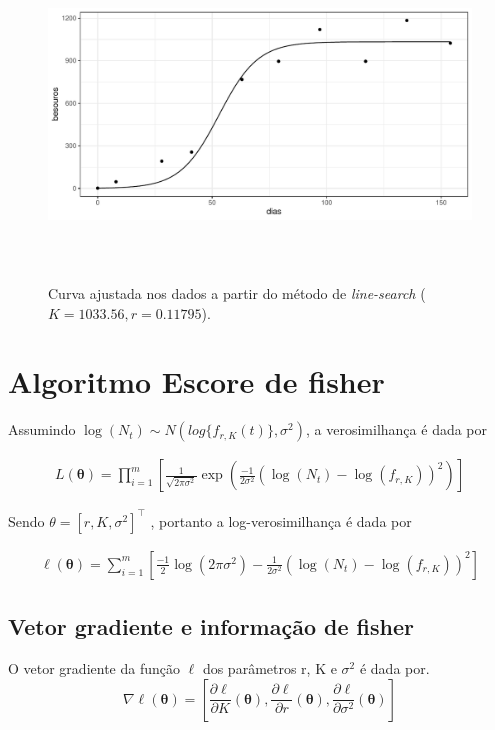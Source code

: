 \documentclass[a4paper,12pt,twoside]{article}
\begin{document}
\begin{figure}[H]
  \centering
  {\includegraphics[width=16cm,height=8cm]{imgs/NR.pdf}}
  \captionsetup{font=footnotesize,width=15cm}
  \caption{\small Curva ajustada nos dados a partir do método de \textit{line-search} ($K=1033.56,r=0.11795$).}
\end{figure}
\section{Algoritmo Escore de fisher}
Assumindo $\log(N_t)\sim N(log\{f_{r,K}(t)\},\sigma^2)$, a verosimilhança é dada por 

\begin{align*}
L(\bm{\theta})=\prod_{i=1}^{m}\left[\frac{1}{\sqrt{2\pi\sigma^2}}\exp{\left(\frac{-1}{2\sigma^2}(\log(N_t)-\log(f_{r,K}))^2\right)}\right]
\end{align*}

Sendo $\theta=[r,K,\sigma^2]^{\top}$ , portanto a log-verosimilhança é dada por

\begin{align*}
\ell(\bm{\theta})=\sum_{i=1}^{m}\left[\frac{-1}{2}\log(2\pi\sigma^2)-\frac{1}{2\sigma^2}(\log(N_t)-\log(f_{r,K}))^2         \right]
\end{align*} 

\subsection*{Vetor gradiente e informação de fisher}
O vetor gradiente da função $\ell$ dos parâmetros r, K e $\sigma^2$ é dada por.
\begin{equation}
\nabla \ell(\bm{\theta})=\left[\frac{\partial \ell}{\partial K}(\bm{\theta}),\frac{\partial \ell}{\partial r}(\bm{\theta}),\frac{\partial \ell}{\partial \sigma^2}(\bm{\theta}) \right]
\end{equation}
\end{document}
